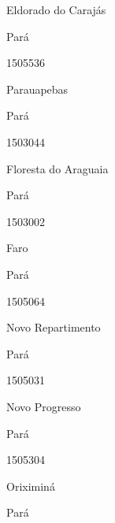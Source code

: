 \documentclass[
  letterpaper,
]{report}
\begin{document}
Eldorado do Carajás

\n    

\n    

\n      

Pará

\n      

1505536

\n      

Parauapebas

\n    

\n    

\n      

Pará

\n      

1503044

\n      

Floresta do Araguaia

\n    

\n    

\n      

Pará

\n      

1503002

\n      

Faro

\n    

\n    

\n      

Pará

\n      

1505064

\n      

Novo Repartimento

\n    

\n    

\n      

Pará

\n      

1505031

\n      

Novo Progresso

\n    

\n    

\n      

Pará

\n      

1505304

\n      

Oriximiná

\n    

\n    

\n      

Pará
\end{document}
